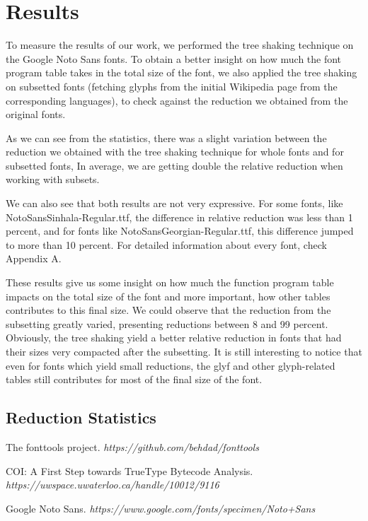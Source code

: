 \documentclass[12pt]{article}
\begin{document}
\section{Results}

To measure the results of our work, we performed the tree shaking
technique on the Google Noto Sans fonts\cite{notosans}. To obtain a
better insight on how much the font program table takes in the total
size of the font, we also applied the tree shaking on  subsetted fonts
(fetching glyphs from the initial Wikipedia page from the corresponding
languages), to check against the reduction we obtained from the original
fonts.



As we can see from the statistics, there was a slight variation between
the reduction we obtained with the tree shaking technique for whole
fonts and for subsetted fonts, In average, we are getting double the
relative reduction when working with subsets. 

We can also see that both results are not very expressive. For
some fonts, like NotoSansSinhala-Regular.ttf, the difference in relative
reduction was less than 1 percent, and for fonts like
NotoSansGeorgian-Regular.ttf, this difference jumped to more than 10
percent. For detailed information about every font, check Appendix A.

These results give us some insight on how much the function program
table impacts on the total size of the font and more important, how
other tables contributes to this final size. We could observe that the
reduction from the subsetting greatly varied, presenting reductions between
8 and 99 percent. Obviously, the tree shaking yield a better relative
reduction in fonts that had their sizes very compacted after the
subsetting. It is still interesting to notice that even for fonts which
yield small reductions, the glyf and other glyph-related tables still
contributes for most of the final size of the font.

\clearpage
\begin{appendices}
\section{Reduction Statistics}



\end{appendices}

\clearpage
\begin{thebibliography}{1}

 The fonttools project. {\em https://github.com/behdad/fonttools } 

 COI: A First Step towards TrueType Bytecode Analysis.
{\em https://uwspace.uwaterloo.ca/handle/10012/9116 } 

 Google Noto Sans. 
{\em https://www.google.com/fonts/specimen/Noto+Sans } 

\end{thebibliography}
\end{document}
